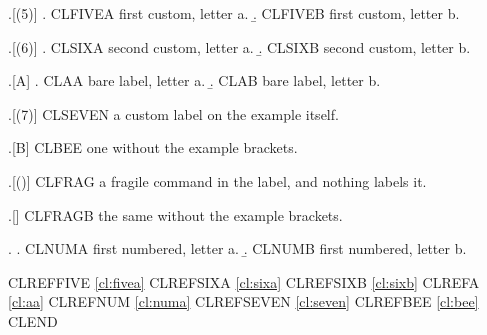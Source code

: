 
\usepackage{hyperref}
\makeatletter
\newcommand\lxfragile{{\parenstrue 3}}
\makeatother

\ex.[(5)] \a.\label{cl:fivea} CLFIVEA first custom, letter a.
\b. CLFIVEB first custom, letter b.

\ex.[(6)] \a.\label{cl:sixa} CLSIXA second custom, letter a.
\b.\label{cl:sixb} CLSIXB second custom, letter b.

\ex.[A] \a.\label{cl:aa} CLAA bare label, letter a.
\b. CLAB bare label, letter b.

\ex.[(7)]\label{cl:seven} CLSEVEN a custom label on the example itself.

\ex.[B]\label{cl:bee} CLBEE one without the example brackets.

\ex.[(\lxfragile)] CLFRAG a fragile command in the label, and nothing labels it.

\ex.[\lxfragile] CLFRAGB the same without the example brackets.

\ex. \a.\label{cl:numa} CLNUMA first numbered, letter a.
\b. CLNUMB first numbered, letter b.

CLREFFIVE \ref{cl:fivea} CLREFSIXA \ref{cl:sixa} CLREFSIXB \ref{cl:sixb}
CLREFA \ref{cl:aa} CLREFNUM \ref{cl:numa}
CLREFSEVEN \ref{cl:seven} CLREFBEE \ref{cl:bee} CLEND

